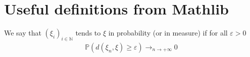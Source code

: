 \chapter{Useful definitions from Mathlib}

\begin{definition}\label{def:cvg_probability}
 \leanok
We say that $(\xi_i)_{i \in \mathbb{N}}$ tends to $\xi$ in probability (or in measure) if for all $\varepsilon > 0$
\begin{align*}
\mathbb{P}(d(\xi_n, \xi) \ge \varepsilon) \to_{n \to +\infty} 0
\end{align*}

\end{definition}